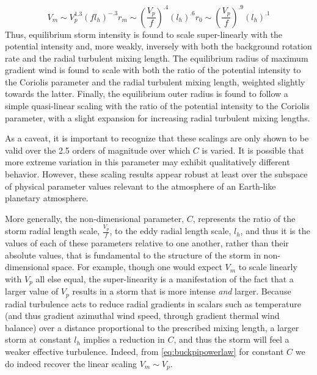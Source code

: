 \documentclass[12pt]{article}
\begin{document}
\begin{subequations}
\label{eq:nondim_all}
\begin{equation}
\label{eq:nondim_Vm}
V_m \sim V_p^{1.3}\left(fl_h\right)^{-.3}
\end{equation}
\begin{equation}
\label{eq:nondim_rm}
r_m \sim \left(\frac{V_p}{f}\right)^{.4}\left(l_h\right)^{.6}
\end{equation}
\begin{equation}
\label{eq:nondim_r0}
r_0 \sim \left(\frac{V_p}{f}\right)^{.9}\left(l_h\right)^{.1}
\end{equation}
\end{subequations}
Thus, equilibrium storm intensity is found to scale super-linearly with the potential intensity and, more weakly, inversely with both the background rotation rate and the radial turbulent mixing length. The equilibrium radius of maximum gradient wind is found to scale with both the ratio of the potential intensity to the Coriolis parameter and the radial turbulent mixing length, weighted slightly towards the latter.  Finally, the equilibrium outer radius is found to follow a simple quasi-linear scaling with the ratio of the potential intensity to the Coriolis parameter, with a slight expansion for increasing radial turbulent mixing lengths.

As a caveat, it is important to recognize that these scalings are only shown to be valid over the 2.5 orders of magnitude over which $C$ is varied. It is possible that more extreme variation in this parameter may exhibit qualitatively different behavior.  However, these scaling results appear robust at least over the subspace of physical parameter values relevant to the atmosphere of an Earth-like planetary atmosphere.

More generally, the non-dimensional parameter, $C$, represents the ratio of the storm radial length scale, $\frac{V_p}{f}$, to the eddy radial length scale, $l_h$, and thus it is the values of each of these parameters relative to one another, rather than their absolute values, that is fundamental to the structure of the storm in non-dimensional space.  For example, though one would expect $V_m$ to scale linearly with $V_p$ all else equal, the super-linearity is a manifestation of the fact that a larger value of $V_p$ results in a storm that is more intense \emph{and} larger. Because radial turbulence acts to reduce radial gradients in scalars such as temperature (and thus gradient azimuthal wind speed, through gradient thermal wind balance) over a distance proportional to the prescribed mixing length, a larger storm at constant $l_h$ implies a reduction in $C$, and thus the storm will feel a weaker effective turbulence.  Indeed, from \eqref{eq:buckpipowerlaw} for constant $C$ we do indeed recover the linear scaling $V_m \sim V_p$.
\end{document}
